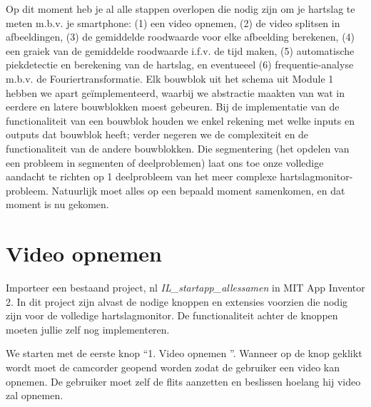 
\begin{samenvatting}
	Op dit moment heb je al alle stappen overlopen die nodig zijn om je hartslag te meten m.b.v. je smartphone: (1) een video opnemen, (2) de video splitsen in afbeeldingen, (3) de gemiddelde roodwaarde voor elke afbeelding berekenen, (4) een graiek van de gemiddelde roodwaarde i.f.v. de tijd maken, (5) automatische piekdetectie en berekening van de hartslag, en eventueeel (6) frequentie-analyse m.b.v. de Fouriertransformatie. 
	Elk bouwblok uit het schema uit Module 1 hebben we apart ge\"implementeerd, waarbij we abstractie maakten van wat in eerdere en latere bouwblokken moest gebeuren.
	Bij de implementatie van de functionaliteit van een bouwblok houden we enkel rekening met welke inputs en outputs dat bouwblok heeft; verder negeren we de complexiteit en de functionaliteit van de andere bouwblokken.
	Die segmentering (het opdelen van een probleem in segmenten of deelproblemen) laat ons toe onze volledige aandacht te richten op 1 deelprobleem van het meer complexe hartslagmonitor-probleem.
	Natuurlijk moet alles op een bepaald moment samenkomen, en dat moment is nu gekomen.
\end{samenvatting}
%

\section{Video opnemen}
\label{sec:Mod5_Sec1}
%
Importeer een bestaand project, nl \emph{IL\_startapp\_allessamen} in MIT App Inventor 2. 
In dit project zijn alvast de nodige knoppen en extensies voorzien die nodig zijn voor de volledige hartslagmonitor. 
De functionaliteit achter de knoppen moeten jullie zelf nog implementeren.

We starten met de eerste knop \textquotedblleft 1. Video opnemen \textquotedblright. Wanneer op de knop geklikt wordt moet de camcorder geopend worden zodat de gebruiker een video kan opnemen. De gebruiker moet zelf de flits aanzetten en beslissen hoelang hij video zal opnemen.

